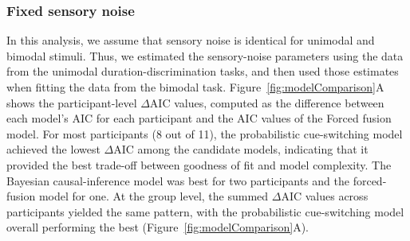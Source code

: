 \documentclass{jov}
\begin{document}



\subsubsection{Fixed sensory noise}
In this analysis, we assume that sensory noise is identical for unimodal and bimodal stimuli. Thus, we estimated the sensory-noise parameters using the data from the unimodal duration-discrimination tasks, and then used those estimates when fitting the data from the bimodal task. Figure~\ref{fig:modelComparison}A shows the participant-level $\Delta$AIC values, computed as the difference between each model's AIC for each participant and the AIC values of the Forced fusion model. For most participants (8 out of 11), the probabilistic cue-switching model achieved the lowest $\Delta$AIC among the candidate models, indicating that it provided the best trade-off between goodness of fit and model complexity. The Bayesian causal-inference model was best for two participants and the forced-fusion model for one. At the group level, the summed $\Delta$AIC values across participants yielded the same pattern, with the probabilistic cue-switching model overall performing the best (Figure~\ref{fig:modelComparison}A).
\end{document}
